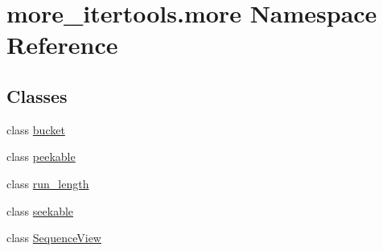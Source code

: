 \hypertarget{namespacemore__itertools_1_1more}{}\section{more\+\_\+itertools.\+more Namespace Reference}
\label{namespacemore__itertools_1_1more}
\subsection*{Classes}
\begin{DoxyCompactItemize}
\item 
class \hyperlink{classmore__itertools_1_1more_1_1bucket}{bucket}
\item 
class \hyperlink{classmore__itertools_1_1more_1_1peekable}{peekable}
\item 
class \hyperlink{classmore__itertools_1_1more_1_1run__length}{run\+\_\+length}
\item 
class \hyperlink{classmore__itertools_1_1more_1_1seekable}{seekable}
\item 
class \hyperlink{classmore__itertools_1_1more_1_1_sequence_view}{Sequence\+View}
\end{DoxyCompactItemize}
